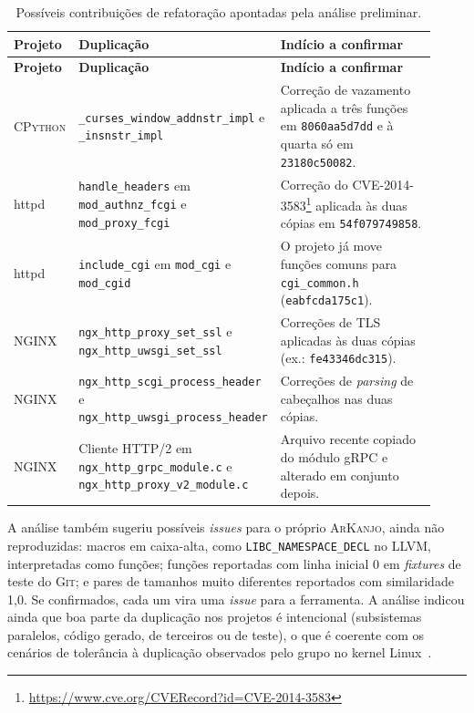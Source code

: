 \documentclass{article}
\newcommand{\ark}{\textsc{ArKanjo}}
\begin{document}
{\small\setlength{\tabcolsep}{4pt}
\begin{longtable}{P{0.15\linewidth}P{0.40\linewidth}P{0.37\linewidth}}
\caption{Possíveis contribuições de refatoração apontadas pela análise preliminar.}
\label{tab:possiveis}\\
\toprule
\textbf{Projeto} & \textbf{Duplicação} & \textbf{Indício a confirmar} \\
\midrule
\endfirsthead
\toprule
\textbf{Projeto} & \textbf{Duplicação} & \textbf{Indício a confirmar} \\
\midrule
\endhead
\bottomrule
\endlastfoot
\textsc{CPython} & \texttt{\_curses\_window\_\allowbreak addnstr\_impl} e \texttt{\_insnstr\_impl} & Correção de vazamento aplicada a três funções em \texttt{8060aa5d7dd} e à quarta só em \texttt{23180c50082}. \\
httpd & \texttt{handle\_headers} em \texttt{mod\_authnz\_fcgi} e \texttt{mod\_proxy\_fcgi} & Correção do CVE-2014-3583\footnote{\url{https://www.cve.org/CVERecord?id=CVE-2014-3583}} aplicada às duas cópias em \texttt{54f079749858}. \\
httpd & \texttt{include\_cgi} em \texttt{mod\_cgi} e \texttt{mod\_cgid} & O projeto já move funções comuns para \texttt{cgi\_common.h} (\texttt{eabfcda175c1}). \\
\textsc{NGINX} & \texttt{ngx\_http\_proxy\_\allowbreak set\_ssl} e \texttt{ngx\_http\_uwsgi\_\allowbreak set\_ssl} & Correções de TLS aplicadas às duas cópias (ex.: \texttt{fe43346dc315}). \\
\textsc{NGINX} & \texttt{ngx\_http\_scgi\_\allowbreak process\_header} e \texttt{ngx\_http\_uwsgi\_\allowbreak process\_header} & Correções de \emph{parsing} de cabeçalhos nas duas cópias. \\
\textsc{NGINX} & Cliente HTTP/2 em \texttt{ngx\_http\_grpc\_module.c} e \texttt{ngx\_http\_proxy\_v2\_module.c} & Arquivo recente copiado do módulo gRPC e alterado em conjunto depois. \\
\end{longtable}}

A análise também sugeriu possíveis \textit{issues} para o próprio \ark{}, ainda não reproduzidas: macros em caixa-alta, como \texttt{LIBC\_NAMESPACE\_DECL} no \textsc{LLVM}, interpretadas como funções; funções reportadas com linha inicial 0 em \textit{fixtures} de teste do \textsc{Git}; e pares de tamanhos muito diferentes reportados com similaridade 1,0. Se confirmados, cada um vira uma \textit{issue} para a ferramenta. A análise indicou ainda que boa parte da duplicação nos projetos é intencional (subsistemas paralelos, código gerado, de terceiros ou de teste), o que é coerente com os cenários de tolerância à duplicação observados pelo grupo no kernel Linux~\cite{duplicationdebt2026}.
\end{document}
